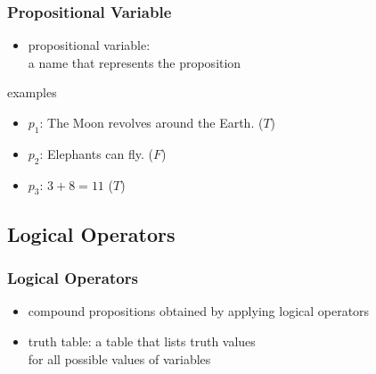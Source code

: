 \documentclass[dvipsnames]{beamer}
\begin{document}
\begin{frame}
  \frametitle{Propositional Variable}

  \begin{itemize}
    \item \alert{propositional variable}:\\
      a name that represents the proposition
  \end{itemize}

  \begin{exampleblock}{examples}
    \begin{itemize}
      \item $p_1$: The Moon revolves around the Earth. ($T$)
      \item $p_2$: Elephants can fly. ($F$)
      \item $p_3$: $3+8=11$ ($T$)
    \end{itemize}
  \end{exampleblock}
\end{frame}

\subsection{Logical Operators}

\begin{frame}
  \frametitle{Logical Operators}

  \begin{itemize}
    \item compound propositions obtained by applying
      \alert{logical operators}
  \end{itemize}

  \pause
  \bigskip
  \begin{itemize}
    \item \alert{truth table}: a table that lists truth values\\
      for all possible values of variables
  \end{itemize}
\end{frame}
\end{document}
